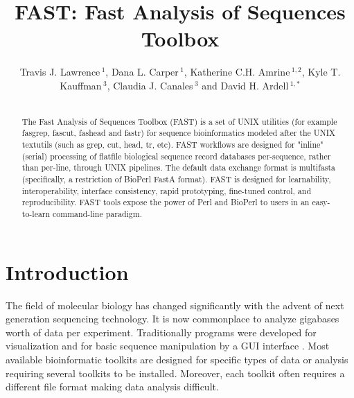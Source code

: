 \documentclass{frontiersSCNS} %
\def\keyFont{\fontsize{8}{11}\helveticabold }
\def\firstAuthorLast{Lawrence {et~al.}} %
\def\Authors{Travis J. Lawrence\,$^{1}$, Dana L. Carper\,$^{1}$,
  Katherine C.H. Amrine\,$^{1,2}$, Kyle T. Kauffman\,$^{3}$, Claudia
  J. Canales\,$^{3}$ and David H. Ardell\,$^{1,*}$}
\begin{document}
\onecolumn
{}

\title[FAST: Fast Analysis of Sequences Toolbox]{FAST: Fast Analysis of Sequences Toolbox}
\author[\firstAuthorLast ]{\Authors}
\address{}
\correspondance{}
\topic{}%

\maketitle

\begin{abstract}

\section{}
The Fast Analysis of Sequences Toolbox (FAST) is a set of UNIX utilities
(for example fasgrep, fascut, fashead and fastr) for sequence bioinformatics
modeled after the UNIX textutils (such as grep, cut, head, tr, etc). FAST
workflows are designed for "inline" (serial) processing of flatfile
biological sequence record databases per-sequence, rather than per-line,
through UNIX pipelines. The default data exchange format is multifasta
(specifically, a restriction of BioPerl FastA format). FAST is designed for
learnability, interoperability, interface consistency, rapid prototyping,
fine-tuned control, and reproducibility. FAST tools expose the power of Perl
and BioPerl to users in an easy-to-learn command-line paradigm.

\tiny
 \keyFont{ \section{Keywords:}  } %
\end{abstract}

\section{Introduction}

%
The field of molecular biology has changed significantly with the
advent of next generation sequencing technology. It is now commonplace
to analyze gigabases worth of data per experiment. Traditionally
programs were developed for visualization and for basic sequence
manipulation by a GUI interface \citep{Smith1994, Rampp2006}. Most
available bioinformatic toolkits are designed for specific types of
data or analysis requiring several toolkits to be installed. Moreover,
each toolkit often requires a different file format making data
analysis difficult.
\end{document}
